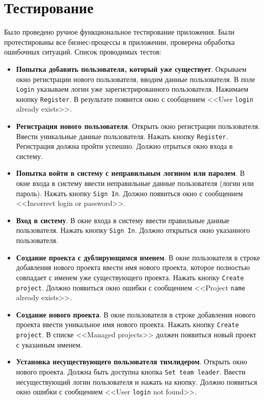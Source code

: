 \section{Тестирование}
Было проведено ручное функциональное тестирование приложения. Были протестированы все бизнес-процессы в приложении, проверена обработка ошибочных ситуаций. Список проводимых тестов:
\begin{itemize}
	\item \textbf{Попытка добавить пользователя, который уже существует}. Окрываем окно регистрации нового пользователя, вводим данные пользователя. В поле \texttt{Login} указываем логин уже зарегистрированного пользователя. Нажимаем кнопку \texttt{Register}. В результате появится окно с сообщением <<User \texttt{login} already exists>>.
	
	\item \textbf{Регистрация нового пользователя}. Открыть окно регистрации пользователя. Ввести уникальные данные пользователя. Нажать кнопку \texttt{Register}. Регистрация должна пройти успешно. Должно отрыться окно входа в систему.
	
	\item \textbf{Попытка войти в систему с неправильным логином или паролем}. В окне входа в систему ввести неправильные данные пользователя (логин или пароль). Нажать кнопку \texttt{Sign In}. Должно появиться окно с сообщением <<Incorrect login or password>>.
	
	\item \textbf{Вход в систему}. В окне входа в систему ввести правильные данные пользователя. Нажать кнопку \texttt{Sign In}. Должно открыться окно указанного пользователя.
	
	\item \textbf{Создание проекта с дублирующимся именем}. В окне пользователя в строке добавления нового проекта ввести имя нового проекта, которое полностью совпадает с именем уже существующего проекта. Нажать кнопку \texttt{Create project}. Должно появиться окно ошибки с сообщением <<Project \texttt{name} already exists>>.
	
	\item \textbf{Создание нового проекта}. В окне пользователя в строке добавления нового проекта ввести уникальное имя нового проекта. Нажать кнопку \texttt{Create project}. В списке <<Managed projects>> должен появиться новый проект с указанным именем.
	
	\item \textbf{Установка несуществующего пользователя тимлидером}. Открыть окно нового проекта. Должна быть доступна кнопка \texttt{Set team leader}. Ввести несуществующий логин пользователя и нажать на кнопку. Должно появиться окно ошибки с сообщением <<User \texttt{login} not found>>.
	

\end{itemize}
